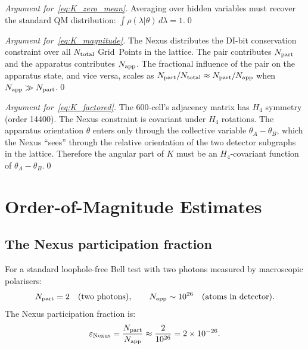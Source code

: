 \documentclass[11pt,letterpaper]{article}
\newcommand{\eps}{\varepsilon}
\begin{document}
\begin{proof}[Argument for~\eqref{eq:K_zero_mean}]
Averaging over hidden variables must recover the standard QM
distribution: $\int \rho(\lambda|\theta)\,d\lambda = 1$.\qed
\end{proof}

\begin{proof}[Argument for~\eqref{eq:K_magnitude}]
The Nexus distributes the DI-bit conservation constraint over all
$N_{\rm total}$ Grid~Points in the lattice.  The pair contributes
$N_{\rm part}$ and the apparatus contributes $N_{\rm app}$.  The
fractional influence of the pair on the apparatus state, and vice
versa, scales as $N_{\rm part}/N_{\rm total} \approx
N_{\rm part}/N_{\rm app}$ when $N_{\rm app} \gg N_{\rm part}$.\qed
\end{proof}

\begin{proof}[Argument for~\eqref{eq:K_factored}]
The 600-cell's adjacency matrix has $H_4$ symmetry (order 14400).
The Nexus constraint is covariant under $H_4$ rotations.  The
apparatus orientation $\theta$ enters only through the collective
variable $\theta_A - \theta_B$, which the Nexus ``sees'' through
the relative orientation of the two detector subgraphs in the
lattice.  Therefore the angular part of $K$ must be an $H_4$-covariant
function of $\theta_A - \theta_B$.\qed
\end{proof}

\section{Order-of-Magnitude Estimates}
\label{sec:magnitude}

\subsection{The Nexus participation fraction}

For a standard loophole-free Bell test with two photons measured by
macroscopic polarisers:
\begin{equation}
N_{\rm part} = 2 \quad (\text{two photons}), \qquad
N_{\rm app} \sim 10^{26} \quad (\text{atoms in detector}).
\label{eq:N_values}
\end{equation}
The Nexus participation fraction is:
\begin{equation}
\eps_{\rm Nexus} = \frac{N_{\rm part}}{N_{\rm app}}
\approx \frac{2}{10^{26}} = 2 \times 10^{-26}.
\label{eq:eps}
\end{equation}
\end{document}
